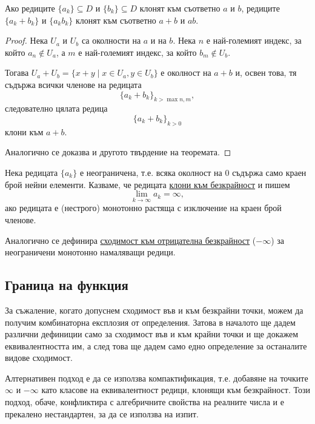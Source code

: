 \documentclass[numbers=endperiod, DIV=15, bibliography=totocnumbered]{scrartcl}
\begin{document}
\begin{proposition}\label{thm:sum-prod-limit}
  Ако редиците $\{ a_k \} \subseteq D$ и $\{ b_k \} \subseteq D$ клонят към съответно $a$ и $b$, редиците $\{ a_k + b_k \}$ и $\{ a_k b_k \}$ клонят към съответно $a + b$ и $ab$.
\end{proposition}
\begin{proof}
  Нека $U_a$ и $U_b$ са околности на $a$ и на $b$. Нека $n$ е най-големият индекс, за който $a_n \not\in U_a$, а $m$ е най-големият индекс, за който $b_m \not\in U_b$.

  Тогава $U_a + U_b = \{ x + y \mid x \in U_a, y \in U_b \}$ е околност на $a + b$ и, освен това, тя съдържа всички членове на редицата
  \begin{displaymath}
    {\{ a_k + b_k \}}_{k > \max{n, m}},
  \end{displaymath}
  следователно цялата редица
  \begin{displaymath}
    {\{ a_k + b_k \}}_{k > 0}
  \end{displaymath}
  клони към $a + b$.

  Аналогично се доказва и другото твърдение на теоремата.
\end{proof}

\begin{definition}
  Нека редицата $\{ a_k \}$ е неограничена, т.е. всяка околност на $0$ съдържа само краен брой нейни елементи. Казваме, че редицата \uline{клони към безкрайност} и пишем
  \begin{displaymath}
    \lim_{k \to \infty} a_k = \infty,
  \end{displaymath}
  ако редицата е (нестрого) монотонно растяща с изключение на краен брой членове.

  Аналогично се дефинира \uline{сходимост към отрицателна безкрайност} ($-\infty$) за неограничени монотонно намаляващи редици.
\end{definition}

\subsection{Граница на функция}

\begin{note}
  За съжаление, когато допуснем сходимост във и към безкрайни точки, можем да получим комбинаторна експлозия от определения. Затова в началото ще дадем различни дефиниции само за сходимост във и към крайни точки и ще докажем еквивалентността им, а след това ще дадем само едно определение за останалите видове сходимост.

  Алтернативен подход е да се използва компактификация, т.е. добавяне на точките $\infty$ и $-\infty$ като класове на еквивалентност редици, клонящи към безкрайност. Този подход, обаче, конфликтира с алгебричните свойства на реалните числа и е прекалено нестандартен, за да се използва на изпит.
\end{note}
\end{document}
